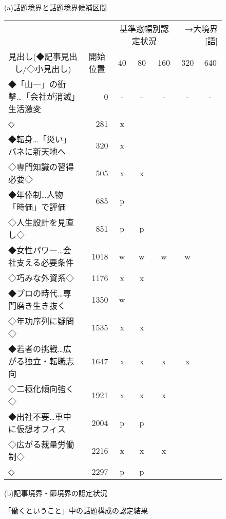 \begin{figure}[htbp]\small
  \begin{center}
    \leavevmode
    \\
    {(a)話題境界と話題境界候補区間}\par
  \end{center}
  \begin{center}
    \leavevmode
    \begin{tabular}{l|r|ccccc}
  &
  & \multicolumn{3}{c}{基準窓幅別認定状況} & \multicolumn{2}{r}{→大境界[語]} \\
\multicolumn{1}{c|}{見出し(◆記事見出し/◇小見出し)}
  & \multicolumn{1}{c|}{開始位置} 
  & 40 & 80 & 160 & 320 & 640 \\
  \hline
◆「山一」の衝撃…「会社が消滅」生活激変 &    0 & - & - & - & - & - \\
\phantom{....}\phantom{....}◇         &  281 & x &   &   &   &   \\
◆転身…「災い」バネに新天地へ         &  320 & x &   &   &   &   \\
\phantom{....}◇専門知識の習得必要◇   &  505 & x & x &   &   &   \\
◆年俸制…人物「時価」で評価           &  685 & p &   &   &   &   \\
\phantom{....}◇人生設計を見直し◇     &  851 & p & p &   &   &   \\
◆女性パワー…会社支える必要条件       & 1018 & w & w & w & w &   \\
\phantom{....}◇巧みな外資系◇           & 1176 & x & x &   &   &   \\
  \hline
◆プロの時代…専門磨き生き抜く         & 1350 & w &   &   &   &   \\
\phantom{....}◇年功序列に疑問◇       & 1535 & x & x &   &   &   \\
◆若者の挑戦…広がる独立・転職志向     & 1647 & x & x & x & x &   \\
\phantom{....}◇二極化傾向強く◇       & 1921 & x & x & x &   &   \\
◆出社不要…車中に仮想オフィス         & 2004 & p & p &   &   &   \\
\phantom{....}◇広がる裁量労働制◇     & 2216 & x & x & x &   &   \\
\phantom{....}\phantom{....}◇         & 2297 & p & p &   &   &   \\
\end{tabular}
  \end{center}
  \begin{center}
    {(b)記事境界・節境界の認定状況}
  \end{center}
  \caption{「働くということ」中の話題構成の認定結果}
  \label{fig:hataraku.result}
\end{figure}

